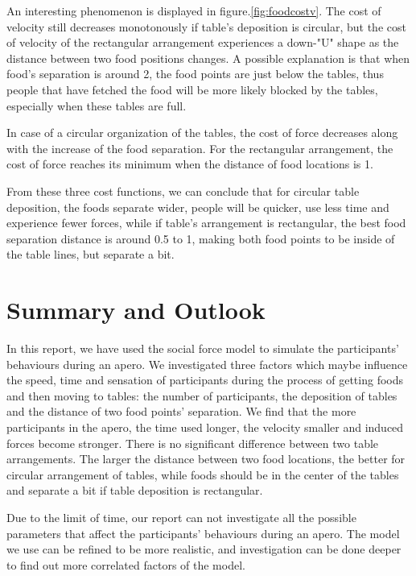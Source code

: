 \documentclass[11pt]{article}
\begin{document}
An interesting phenomenon is displayed in figure.\ref{fig:foodcostv}. The cost of velocity still decreases monotonously if table's deposition is circular, but the cost of velocity of the rectangular arrangement experiences a down-"U" shape as the distance between two food positions changes. A possible explanation is that when food's separation is around 2, the food points are just below the tables, thus people that have fetched the food will be more likely blocked by the tables, especially when these tables are full.

In case of a circular organization of the tables, the cost of force decreases along with the increase of the food separation. For the rectangular arrangement, the cost of force reaches its minimum when the distance of food locations is 1.

From these three cost functions, we can conclude that for circular table deposition, the foods separate wider, people will be quicker, use less time and experience fewer forces, while if table's arrangement is rectangular, the best food separation distance is around 0.5 to 1, making both food points to be inside of the table lines, but separate a bit.


\section{Summary and Outlook}
In this report, we have used the social force model to simulate the participants' behaviours during an apero. We investigated three factors which maybe influence the speed, time and sensation of participants during the process of getting foods and then moving to tables: the number of participants, the deposition of tables and the distance of two food points' separation. We find that the more participants in the apero, the time used longer, the velocity smaller and induced forces become stronger. There is no significant difference between two table arrangements. The larger the distance between two food locations, the better for circular arrangement of tables, while foods should be in the center of the tables and separate a bit if table deposition is rectangular.

Due to the limit of time, our report can not investigate all the possible parameters that affect the participants' behaviours during an apero. The model we use can be refined to be more realistic, and investigation can be done deeper to find out more correlated factors of the model.




\end{document}
